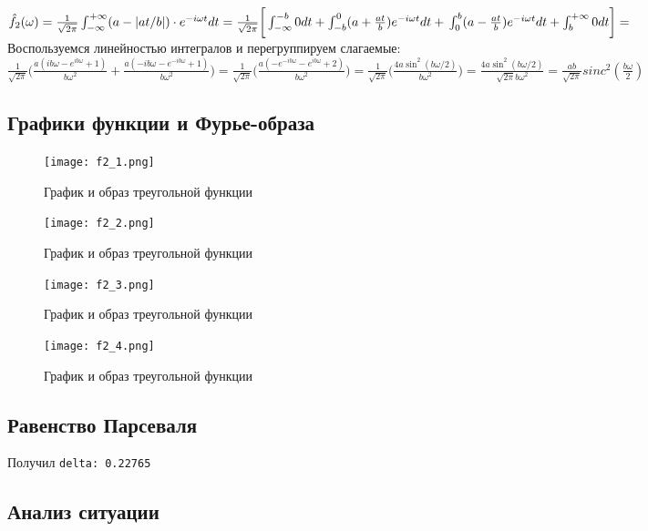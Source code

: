 $\hat{f_2}(\omega) = \frac{1}{\sqrt{2\pi}}\int^{+\infty}_{-\infty}(a-|at/b|)\cdot e^{-i\omega t} dt =  \frac{1}{\sqrt{2\pi}}\bigg[\int^{-b}_{-\infty}0 dt + \int^{0}_{-b}(a + \frac{at}{b})e^{-i\omega t}dt + \\ \int^{b}_{0}(a - \frac{at}{b})e^{-i\omega t}dt + \int^{+\infty}_{b}0dt \bigg]=$ \\
Воспользуемся линейностью интегралов и перегруппируем слагаемые:
$\frac{1}{\sqrt{2\pi}}\bigg( \frac{a(ib\omega - e^{ib\omega} + 1)}{b\omega^2} + \frac{a(-ib\omega - e^{-ib\omega} + 1)}{b\omega^2} \bigg) = \frac{1}{\sqrt{2\pi}}\bigg( \frac{a(- e^{-ib\omega} - e^{ib\omega} + 2)}{b\omega^2}  \bigg) = \frac{1}{\sqrt{2\pi}}\bigg( \frac{4a\sin^2(b\omega/2)}{b\omega^2}  \bigg) = \frac{4a\sin^2(b\omega/2)}{\sqrt{2\pi} b\omega^2} = \frac{ab}{\sqrt{2\pi}}sinc^2(\frac{b\omega}{2})$

\newpage
\subsection{Графики функции и Фурье-образа}

\begin{figure}[ht]
    \centering
    \texttt{[image: f2\_1.png]}
    \caption{График и образ треугольной функции}
\end{figure}

\begin{figure}[ht]
    \centering
    \texttt{[image: f2\_2.png]}
    \caption{График и образ треугольной функции}
\end{figure}

\begin{figure}[ht]
    \centering
    \texttt{[image: f2\_3.png]}
    \caption{График и образ треугольной функции}
\end{figure}

\begin{figure}[ht]
    \centering
    \texttt{[image: f2\_4.png]}
    \caption{График и образ треугольной функции}
\end{figure}
\newpage

\subsection{Равенство Парсеваля}

Получил \texttt{delta: 0.22765}

\subsection{Анализ ситуации}

